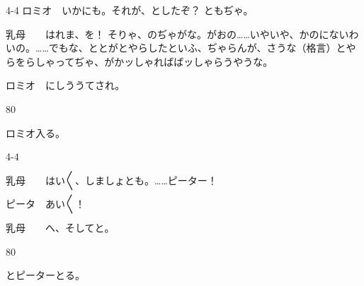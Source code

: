 \documentclass[tate,paper=b6j,jafontsize=9pt]{jlreq}
\begin{document}
\begin{azconvIndented}{4\zw}{-4\zw}
ロミオ　いかにも。それが、としたぞ？ ともぢゃ。

乳母　　はれま、を！ そりゃ、のぢゃがな。がおの……いやいや、かのにないわいの。……でもな、ととがとやらしたといふ、ぢゃらんが、さうな（格言）とやらをらしゃってぢゃ、がかッしゃればばッしゃらうやうな。

ロミオ　にしううてされ。

\end{azconvIndented}
\begin{azconvIndented}{8\zw}{0\zw}

ロミオ入る。

\end{azconvIndented}
\begin{azconvIndented}{4\zw}{-4\zw}

乳母　　はい{〳〵}、しましょとも。……ピーター！

ピータ　あい{〳〵}！

乳母　　へ、そしてと。

\end{azconvIndented}
\begin{azconvIndented}{8\zw}{0\zw}

とピーターとる。

\end{azconvIndented}

\end{document}
